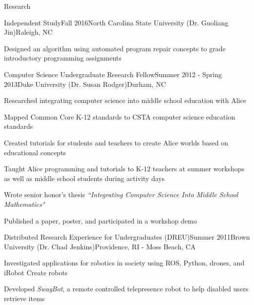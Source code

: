 \documentclass{resume} %
\begin{document}
\begin{rSection}{Research}
\begin{rSubsection}{Independent Study}{Fall 2016}{North Carolina State University (Dr. Guoliang Jin)}{Raleigh, NC}
\item Designed an algorithm using automated program repair concepts to grade introductory programming assignments
\end{rSubsection}
\vspace{-5pt}

\begin{rSubsection}{Computer Science Undergraduate Research Fellow}{Summer 2012 - Spring 2013}{Duke University (Dr. Susan Rodger)}{Durham, NC}
\item Researched integrating computer science into middle school education with Alice
\item Mapped Common Core K-12 standards to CSTA computer science education standards
\item Created tutorials for students and teachers to create Alice worlds based on educational concepts
\item Taught Alice programming and tutorials to K-12 teachers at summer workshops as well as middle school students during activity days
\item Wrote senior honor's thesis \textit{``Integrating Computer Science Into Middle School Mathematics"} 
\item Published a paper, poster, and participated in a workshop demo
\end{rSubsection}
\vspace{-5pt}

\begin{rSubsection}{Distributed Research Experience for Undergraduates (DREU)}{Summer 2011}{Brown University (Dr. Chad Jenkins)}{Providence, RI - Moss Beach, CA}
\item Investigated applications for robotics in society using ROS, Python, drones, and iRobot Create robots
\item Developed \textsl{SwagBot}, a remote controlled telepresence robot to help disabled users retrieve items
\end{rSubsection}

\end{rSection}
\end{document}
